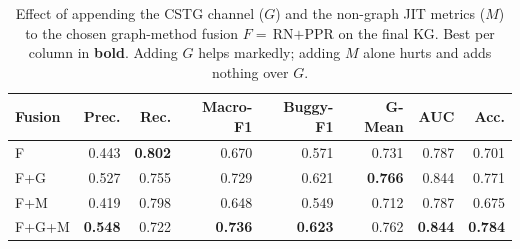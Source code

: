\begin{table}[H]
\centering \small
\caption{Effect of appending the CSTG channel ($G$) and the non-graph JIT metrics ($M$) to the chosen graph-method fusion $F=$\,RN$+$PPR on the final KG. Best per column in \textbf{bold}. Adding $G$ helps markedly; adding $M$ alone hurts and adds nothing over $G$.}
\label{tab:v4-final-fusion-gm}
\begin{tabular}{lrrrrrrr}
\toprule
Fusion & Prec. & Rec. & Macro-F1 & Buggy-F1 & G-Mean & AUC & Acc. \\
\midrule
F & 0.443 & \textbf{0.802} & 0.670 & 0.571 & 0.731 & 0.787 & 0.701 \\
F+G & 0.527 & 0.755 & 0.729 & 0.621 & \textbf{0.766} & 0.844 & 0.771 \\
F+M & 0.419 & 0.798 & 0.648 & 0.549 & 0.712 & 0.787 & 0.675 \\
F+G+M & \textbf{0.548} & 0.722 & \textbf{0.736} & \textbf{0.623} & 0.762 & \textbf{0.844} & \textbf{0.784} \\
\bottomrule
\end{tabular}
\end{table}